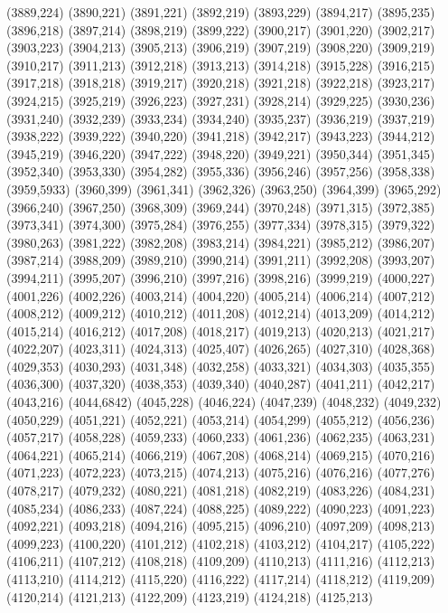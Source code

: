 (3889,224)
(3890,221)
(3891,221)
(3892,219)
(3893,229)
(3894,217)
(3895,235)
(3896,218)
(3897,214)
(3898,219)
(3899,222)
(3900,217)
(3901,220)
(3902,217)
(3903,223)
(3904,213)
(3905,213)
(3906,219)
(3907,219)
(3908,220)
(3909,219)
(3910,217)
(3911,213)
(3912,218)
(3913,213)
(3914,218)
(3915,228)
(3916,215)
(3917,218)
(3918,218)
(3919,217)
(3920,218)
(3921,218)
(3922,218)
(3923,217)
(3924,215)
(3925,219)
(3926,223)
(3927,231)
(3928,214)
(3929,225)
(3930,236)
(3931,240)
(3932,239)
(3933,234)
(3934,240)
(3935,237)
(3936,219)
(3937,219)
(3938,222)
(3939,222)
(3940,220)
(3941,218)
(3942,217)
(3943,223)
(3944,212)
(3945,219)
(3946,220)
(3947,222)
(3948,220)
(3949,221)
(3950,344)
(3951,345)
(3952,340)
(3953,330)
(3954,282)
(3955,336)
(3956,246)
(3957,256)
(3958,338)
(3959,5933)
(3960,399)
(3961,341)
(3962,326)
(3963,250)
(3964,399)
(3965,292)
(3966,240)
(3967,250)
(3968,309)
(3969,244)
(3970,248)
(3971,315)
(3972,385)
(3973,341)
(3974,300)
(3975,284)
(3976,255)
(3977,334)
(3978,315)
(3979,322)
(3980,263)
(3981,222)
(3982,208)
(3983,214)
(3984,221)
(3985,212)
(3986,207)
(3987,214)
(3988,209)
(3989,210)
(3990,214)
(3991,211)
(3992,208)
(3993,207)
(3994,211)
(3995,207)
(3996,210)
(3997,216)
(3998,216)
(3999,219)
(4000,227)
(4001,226)
(4002,226)
(4003,214)
(4004,220)
(4005,214)
(4006,214)
(4007,212)
(4008,212)
(4009,212)
(4010,212)
(4011,208)
(4012,214)
(4013,209)
(4014,212)
(4015,214)
(4016,212)
(4017,208)
(4018,217)
(4019,213)
(4020,213)
(4021,217)
(4022,207)
(4023,311)
(4024,313)
(4025,407)
(4026,265)
(4027,310)
(4028,368)
(4029,353)
(4030,293)
(4031,348)
(4032,258)
(4033,321)
(4034,303)
(4035,355)
(4036,300)
(4037,320)
(4038,353)
(4039,340)
(4040,287)
(4041,211)
(4042,217)
(4043,216)
(4044,6842)
(4045,228)
(4046,224)
(4047,239)
(4048,232)
(4049,232)
(4050,229)
(4051,221)
(4052,221)
(4053,214)
(4054,299)
(4055,212)
(4056,236)
(4057,217)
(4058,228)
(4059,233)
(4060,233)
(4061,236)
(4062,235)
(4063,231)
(4064,221)
(4065,214)
(4066,219)
(4067,208)
(4068,214)
(4069,215)
(4070,216)
(4071,223)
(4072,223)
(4073,215)
(4074,213)
(4075,216)
(4076,216)
(4077,276)
(4078,217)
(4079,232)
(4080,221)
(4081,218)
(4082,219)
(4083,226)
(4084,231)
(4085,234)
(4086,233)
(4087,224)
(4088,225)
(4089,222)
(4090,223)
(4091,223)
(4092,221)
(4093,218)
(4094,216)
(4095,215)
(4096,210)
(4097,209)
(4098,213)
(4099,223)
(4100,220)
(4101,212)
(4102,218)
(4103,212)
(4104,217)
(4105,222)
(4106,211)
(4107,212)
(4108,218)
(4109,209)
(4110,213)
(4111,216)
(4112,213)
(4113,210)
(4114,212)
(4115,220)
(4116,222)
(4117,214)
(4118,212)
(4119,209)
(4120,214)
(4121,213)
(4122,209)
(4123,219)
(4124,218)
(4125,213)
